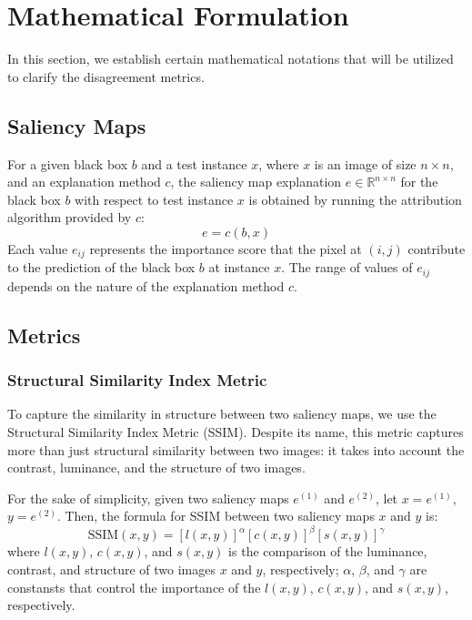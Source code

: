 \section{Mathematical Formulation}
In this section, we establish certain mathematical notations that will be utilized to clarify the disagreement metrics.

\subsection{Saliency Maps}
For a given black box $b$ and a test instance $x$, where $x$ is an image of size $n \times n$, and an explanation method $c$, the saliency map explanation $e \in \mathbb{R}^{n\times n}$ for the black box $b$ with respect to test instance $x$ is obtained by running the attribution algorithm provided by $c$:
\begin{equation}
    e = c(b, x)
\end{equation}
Each value $e_{ij}$ represents the importance score that the pixel at $(i, j)$ contribute to the prediction of the black box $b$ at instance $x$. The range of values of $e_{ij}$ depends on the nature of the explanation method $c$.

\subsection{Metrics}
\label{subsec:metrics}
\subsubsection{Structural Similarity Index Metric}
To capture the similarity in structure between two saliency maps, we use the Structural Similarity Index Metric (SSIM). Despite its name, this metric captures more than just structural similarity between two images: it takes into account the contrast, luminance, and the structure of two images.

For the sake of simplicity, given two saliency maps $e^{(1)}$ and $e^{(2)}$, let $x = e^{(1)}$, $y = e^{(2)}$. Then, the formula for SSIM between two saliency maps $x$ and $y$ is:
\begin{equation}
    \text{SSIM}(x, y) = [l(x, y)]^\alpha [c(x, y)]^\beta [s(x, y)]^\gamma
\end{equation}
where $l(x,y)$, $c(x,y)$, and $s(x,y)$ is the comparison of the luminance, contrast, and structure of two images $x$ and $y$, respectively; $\alpha$, $\beta$, and $\gamma$ are constansts that control the importance of the $l(x,y)$, $c(x,y)$, and $s(x,y)$, respectively.

